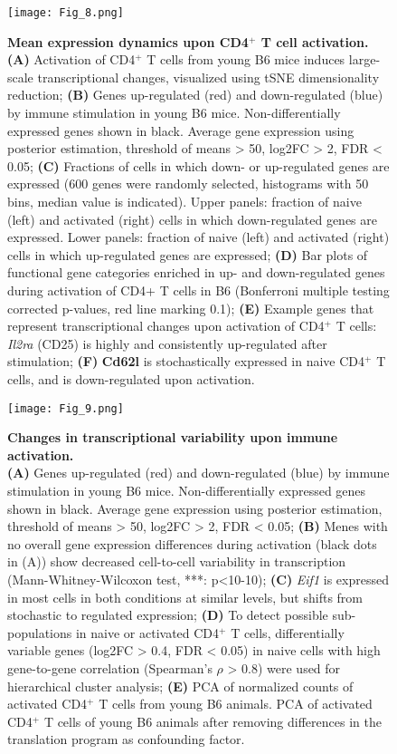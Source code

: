 \begin{figure}[!ht]
\centering
\texttt{[image: Fig\_8.png]}
\caption[Mean expression dynamics upon CD4$^+$ T cell activation]{\textbf{Mean expression dynamics upon CD4$^+$ T cell activation.}\\
\textbf{(A)} Activation of CD4$^+$ T cells from young B6 mice induces large-scale transcriptional changes, visualized using tSNE dimensionality reduction; \textbf{(B)} Genes up-regulated (red) and down-regulated (blue) by immune stimulation in young B6 mice. Non-differentially expressed genes shown in black. Average gene expression using posterior estimation, threshold of means > 50, log2FC > 2, FDR < 0.05; \textbf{(C)} Fractions of cells in which down- or up-regulated genes are expressed (600 genes were randomly selected, histograms with 50 bins, median value is indicated). Upper panels: fraction of naive (left) and activated (right) cells in which down-regulated genes are expressed. Lower panels: fraction of naive (left) and activated (right) cells in which up-regulated genes are expressed; \textbf{(D)} Bar plots of functional gene categories enriched in up- and down-regulated genes during activation of CD4+ T cells in B6 (Bonferroni multiple testing corrected p-values, red line marking 0.1); \textbf{(E)} Example genes that represent transcriptional changes upon activation of CD4$^+$ T cells: \textit{Il2ra} (CD25) is highly and consistently up-regulated after stimulation; \textbf{(F)} \textbf{Cd62l} is stochastically expressed in naive CD4$^+$ T cells, and is down-regulated upon activation.
}
\label{fig1:immune_activation}
\end{figure}

\newpage

\begin{figure}[!ht]
\centering
\texttt{[image: Fig\_9.png]}
\caption[Changes in transcriptional variability upon immune activation]{\textbf{Changes in transcriptional variability upon immune activation.}\\
\textbf{(A)} Genes up-regulated (red) and down-regulated (blue) by immune stimulation in young B6 mice. Non-differentially expressed genes shown in black. Average gene expression using posterior estimation, threshold of means > 50, log2FC > 2, FDR < 0.05; \textbf{(B)} Menes with no overall gene expression differences during activation (black dots in (A)) show decreased cell-to-cell variability in transcription (Mann-Whitney-Wilcoxon test, ***: p<10-10); \textbf{(C)} \textit{Eif1} is expressed in most cells in both conditions at similar levels, but shifts from stochastic to regulated expression; \textbf{(D)} To detect possible sub-populations in naive or activated CD4$^+$ T cells, differentially variable genes (log2FC > 0.4, FDR < 0.05) in naive cells with high gene-to-gene correlation (Spearman’s $\rho$ > 0.8) were used for hierarchical cluster analysis; \textbf{(E)} PCA of normalized counts of activated CD4$^+$ T cells from young B6 animals. PCA of activated CD4$^+$ T cells of young B6 animals after removing differences in the translation program as confounding factor.
}
\label{fig1:immune_variability}
\end{figure}

